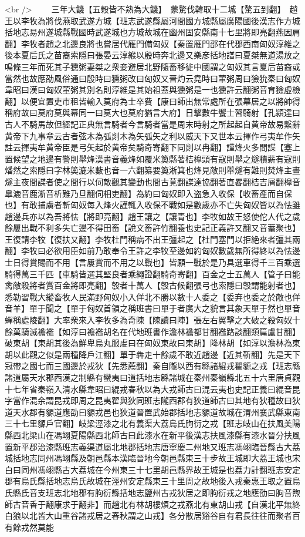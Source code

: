 <br />
　　三年大饑【五穀皆不熟為大饑】　蒙驁伐韓取十二城【驁五到翻】　趙王以李牧為將伐燕取武遂方城【班志武遂縣屬河間國方城縣屬廣陽國後漢志作方城括地志易州遂城縣戰國時武遂城也方城故城在幽州固安縣南十七里將即亮翻燕因肩翻】李牧者趙之北邊良將也嘗居代雁門備匈奴【秦置雁門邵在代郡西南匈奴淳維之後本夏后氏之苗裔索隱曰張晏云淳緱以殷時奔北邊又樂彦括地譜曰夏桀無道湯放之鳴條三年而死其子獯粥妻桀之衆妾避居北野隨畜移徙中國謂之匈奴其言夏后苗裔或當然也故應劭風俗通曰殷時曰獯粥改曰匈奴又晉灼云堯時曰葷粥周曰獫狁秦曰匈奴韋昭曰漢曰匈奴葷粥其別名則淳維是其始祖蓋與獯粥是一也獯許云翻粥音育獫虛檢翻】以便宜置吏市租皆輸入莫府為士卒費【康曰師出無常處所在張幕居之以將帥得稱府故曰莫府莫與幕同一曰莫大也莫府猶言大府】日擊數牛饗士習騎射【孔潁達曰古人不騎馬故但經記正典無言騎者今言騎者當是周末時射之所起起自黄帝故易繫辭黄帝下九事章云古者弦木為弧剡木為矢弧矢之利以威天下又世本云揮作弓夷牟作矢註云揮夷牟黄帝臣是弓矢起於黄帝矣騎奇寄翻下同剡以冉翻】謹烽火多間諜【塞上置候望之地邊有警則舉烽漢書音義烽如覆米䉛縣著桔橰頭有寇則舉之燧積薪有寇則燔然之索隱曰字林䉛漉米藪也音一六翻纂要䉛淅箕也烽見敵則舉燧有難則焚烽主晝燧主夜間諜者使之間行以伺敵觀其變動也間古莧翻諜達協翻著直畧翻桔吉屑翻橰音臯漉音鹿淅音析難乃旦翻伺相吏翻】為約曰匈奴即入盗急入收保【收畜產而自保也】有敢捕虜者斬匈奴每入烽火謹輒入收保不戰如是數歲亦不亡失匈奴皆以為怯雖趙邊兵亦以為吾將怯【將即亮翻】趙王讓之【讓青也】李牧如故王怒使佗人代之歲餘屢出戰不利多失亡邊不得田畜【說文畜許竹翻養也史記正義許又翻又音蓄聚也】王復請李牧【復扶又翻】李牧杜門稱病不出王彊起之【杜門塞門以拒絶來者彊其兩翻】李牧曰必欲用臣如前乃敢奉令王許之李牧至邊如約匈奴數歲無所得終以為怯邊士日得賞賜而不用【言屢賞而不用之以戰也】皆願一戰於是乃具選車得千三百乘選騎得萬三千匹【車騎皆選其堅良者乘繩證翻騎奇寄翻】百金之士五萬人【管子曰能禽敵殺將者賞百金將即亮翻】彀者十萬人【彀古候翻張弓也索隱曰彀謂能射者也】悉勒習戰大縱畜牧人民滿野匈奴小入佯北不勝以數十人委之【委弃也委之於敵也佯音羊】單于聞之【單于匈奴首領之稱班書曰單于者廣大之貌言其象天單于然也單音蟬稱處陵翻】大率衆來入李牧多為奇陳【陳讀曰陣】張左右翼擊之大破之殺匈奴十餘萬騎滅襜襤【如淳曰襜襤胡名在代地班書作澹林襜都甘翻襤路談翻類篇盧甘翻】破東胡【東胡其後為鮮卑烏丸服䖍曰在匈奴東故曰東胡】降林胡【如淳以澹林為東胡以此觀之似是兩種降戶江翻】單于犇走十餘歲不敢近趙邊【近其靳翻】先是天下冠帶之國七而三國邊於戎狄【先悉薦翻】秦自隴以西有緜諸緄戎翟䝠之戎【班志緜諸道屬天水郡西漢之制縣有蠻夷曰道括地志緜諸城在秦州秦嶺縣北五十六里唐貞觀十七年省秦嶺入清水縣韋昭曰緄戎春秋以為大戎師古曰混云夷也史記正義曰緄音昆字當作混余謂昆戎即周之昆夷翟與狄同班志隴西郡有狄道師古曰其地有狄種故曰狄道天水郡有䝠道應劭曰䝠戎邑也狄道晉置武始郡括地志䝠道故城在渭州襄武縣東南三十七里䝠戶官翻】岐梁涇漆之北有義渠大荔烏氏朐衍之戎【班志岐山在扶風美陽縣西北梁山在馮翊夏陽縣西北師古曰此漆水在新平後漢志扶風漆縣有漆水晉分扶風置新平郡治漆縣班志義渠道屬北地郡括地志唐寧慶二州地又班志馮翊臨晉縣古大荔城括地志同州馮翊縣及朝邑縣本漢臨晉地今朝邑縣東三十步故王城即大荔王城也宋白曰同州馮翊縣古大荔城在今州東三十七里胡邑縣界故王城是也荔力計翻班志安定郡有烏氏縣括地志烏氏故城在涇州安定縣東三十里周之故地後入戎秦惠王取之置烏氏縣氏音支班志北地郡有朐衍縣括地志鹽州古戎狄居之即朐衍戎之地應劭曰朐音煦師古音香于翻康求于翻非】而趙北有林胡樓煩之戎燕北有東胡山戎【自漢北平無終白狼以北皆大山重谷諸戎居之春秋謂之山戎】各分散居谿谷自有君長往往而聚者百有餘戎然莫能
